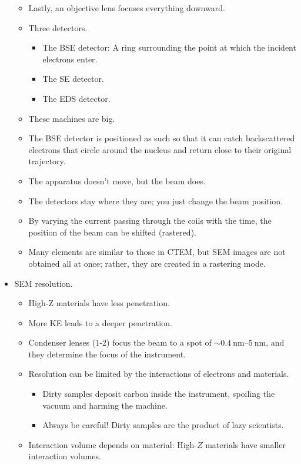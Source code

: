 \documentclass[../notes.tex]{subfiles}
\begin{document}
\begin{itemize}
\begin{itemize}
        \item Lastly, an objective lens focuses everything downward.
        \item Three detectors.
        \begin{itemize}
            \item The BSE detector: A ring surrounding the point at which the incident electrons enter.
            \item The SE detector.
            \item The EDS detector.
        \end{itemize}
        \item These machines are big.
        \item The BSE detector is positioned as such so that it can catch backscattered electrons that circle around the nucleus and return close to their original trajectory.
        \item The apparatus doesn't move, but the beam does.
        \item The detectors stay where they are; you just change the beam position.
        \item By varying the current passing through the coils with the time, the position of the beam can be shifted (rastered).
        \item Many elements are similar to those in CTEM, but SEM images are not obtained all at once; rather, they are created in a rastering mode.
    \end{itemize}
    \item SEM resolution.
    \begin{itemize}
        \item High-Z materials have less penetration.
        \item More KE leads to a deeper penetration.
        \item Condenser lenses (1-2) focus the beam to a spot of $\sim\SIrange{0.4}{5}{\nano\meter}$, and they determine the focus of the instrument.
        \item Resolution can be limited by the interactions of electrons and materials.
        \begin{itemize}
            \item Dirty samples deposit carbon inside the instrument, spoiling the vacuum and harming the machine.
            \item Always be careful! Dirty samples are the product of lazy scientists.
        \end{itemize}
        \item Interaction volume depends on material: High-$Z$ materials have smaller interaction volumes.

\end{itemize}
\end{itemize}
\end{document}
